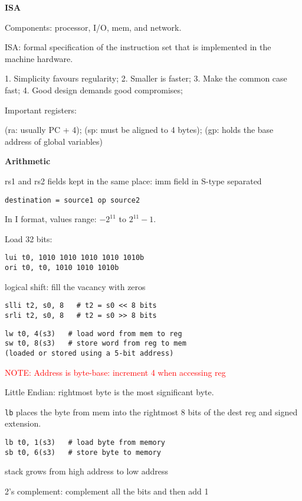 \documentclass[10pt,landscape,a4paper]{article}
\begin{document}
\begin{multicols}{3}
\textbf{ISA}

Components: processor, I/O, mem, and network.

ISA: formal specification of the instruction set that is implemented in the machine hardware. 

1. Simplicity favours regularity; 2. Smaller is faster; 3. Make the common case fast; 4. Good design demands good compromises; 

Important registers: 

(ra: usually PC + 4); (sp: must be aligned to 4 bytes); (gp: holds the base address of global variables)

\textbf{Arithmetic}

rs1 and rs2 fields kept in the same place: imm field in S-type separated
\begin{verbatim}
destination = source1 op source2
\end{verbatim}
In I format, values range: \(-2^{11}\) to \(2^{11} - 1\). 

Load 32 bits:
\begin{verbatim}
lui t0, 1010 1010 1010 1010 1010b
ori t0, t0, 1010 1010 1010b
\end{verbatim}

logical shift: fill the vacancy with zeros
\begin{verbatim}
slli t2, s0, 8   # t2 = s0 << 8 bits
srli t2, s0, 8   # t2 = s0 >> 8 bits
\end{verbatim}
\begin{verbatim}
lw t0, 4(s3)   # load word from mem to reg
sw t0, 8(s3)   # store word from reg to mem
(loaded or stored using a 5-bit address)
\end{verbatim}

\textcolor{red}{NOTE: Address is byte-base: increment 4 when accessing reg}

Little Endian: rightmost byte is the most significant byte.

\verb|lb| places the byte from mem into the rightmost 8 bits of the dest reg and signed extension.
\begin{verbatim}
lb t0, 1(s3)   # load byte from memory
sb t0, 6(s3)   # store byte to memory
\end{verbatim}

stack grows from high address to low address

2's complement: complement all the bits and then add 1


\end{multicols}
\end{document}
